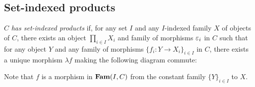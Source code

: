 \subsection{Set-indexed products}

$C$ \emph{has set-indexed products} if, for any set $I$ and any $I$-indexed family $X$ of objects of $C$,
there exists an object $\prod_{i \in I}X_i$ and family of morphisms $\varepsilon_i$ in $C$ such that for any object
$Y$ and any family of morphisms $\{f_i: Y \to X_i\}_{i \in I}$ in $C$, there exists a unique morphism $\lambda
f$ making the following diagram commute:

\begin{center}
\end{center}

Note that $f$ is a morphism in $\mathbf{Fam}(I,C)$ from the constant family $\{Y\}_{i \in I}$ to $X$.
